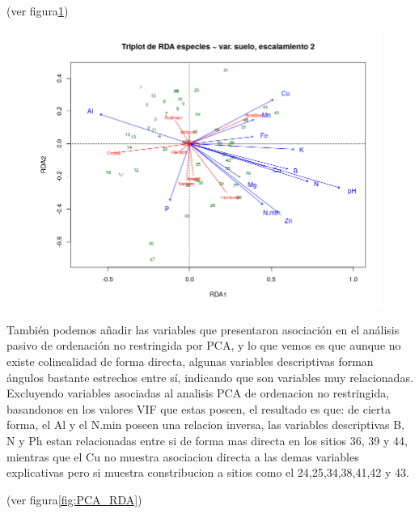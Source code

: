 \documentclass[11pt,]{article}
\begin{document}
(ver figura\ref{fig:RDA})

\begin{figure}
\centering
\includegraphics{RDA.png}
\caption{\label{fig:RDA}}
\end{figure}

También podemos añadir las variables que presentaron asociación en el
análisis pasivo de ordenación no restringida por PCA, y lo que vemos es
que aunque no existe colinealidad de forma directa, algunas variables
descriptivas forman ángulos bastante estrechos entre sí, indicando que
son variables muy relacionadas. Excluyendo variables asociadas al
analisis PCA de ordenacion no restringida, basandonos en los valores VIF
que estas poseen, el resultado es que: de cierta forma, el Al y el N.min
poseen una relacion inversa, las variables descriptivas B, N y Ph estan
relacionadas entre si de forma mas directa en los sitios 36, 39 y 44,
mientras que el Cu no muestra asociacion directa a las demas variables
explicativas pero si muestra constribucion a sitios como el
24,25,34,38,41,42 y 43.

(ver figura\ref{fig:PCA_RDA})
\end{document}

